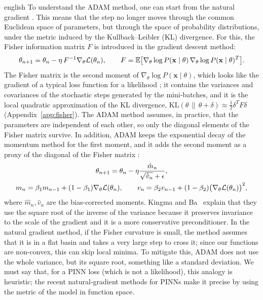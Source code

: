 \documentclass[../0000.tex]{subfiles}
\begin{document}
\begin{hyphenrules}{english}
To understand the ADAM method, one can start from the natural gradient
\cite{amari1998,pascanu2013}. This means that the step no longer moves through the common Euclidean
space of parameters, but through the space of probability distributions, under the metric induced by
the Kullback--Leibler (KL) divergence. For this, the Fisher information matrix $F$ is introduced in the
gradient descent method:
\begin{equation}
  \theta_{n+1}=\theta_n-\eta\,F^{-1}\nabla_\theta\mathcal{L}(\theta_n),\qquad
  F=\mathbb{E}\big[\nabla_\theta\log P(\mathbf{x}\mid\theta)\,\nabla_\theta\log P(\mathbf{x}\mid\theta)^{T}\big].
  \label{eq:natural-gradient}
\end{equation}
The Fisher matrix is the second moment of $\nabla_\theta\log P(\mathbf{x}\mid\theta)$, which looks like the
gradient of a typical loss function for a likelihood \cite{amari1998}; it contains the variances and
covariances of the stochastic steps generated by the mini-batches, and it is the local quadratic
approximation of the KL divergence, $\mathrm{KL}(\theta\,\|\,\theta+\delta)\approx\frac12\delta^{T}F\delta$
(Appendix~\ref{app:fisher}). The ADAM method assumes, in practice, that the parameters are independent of each
other, so only the diagonal elements of the Fisher matrix survive. In addition, ADAM keeps the exponential
decay of the momentum method \cite{ruder2016} for the first moment, and it adds the second moment as
a proxy of the diagonal of the Fisher matrix \cite{kingma2015}:
\begin{equation}
  \begin{gathered}
  \theta_{n+1}=\theta_n-\eta\frac{\hat m_n}{\sqrt{\hat v_n}+\epsilon},\\
  m_n=\beta_1m_{n-1}+(1-\beta_1)\nabla_\theta\mathcal{L}(\theta_n),\qquad
  v_n=\beta_2v_{n-1}+(1-\beta_2)\big(\nabla_\theta\mathcal{L}(\theta_n)\big)^2,
  \end{gathered}
  \label{eq:adam}
\end{equation}
where $\hat m_n,\hat v_n$ are the bias-corrected moments. Kingma and Ba~\cite{kingma2015} explain that they use the
square root of the inverse of the variance because it preserves invariance to the scale of the gradient
and it is a more conservative preconditioner. In the natural gradient method, if the Fisher curvature is
small, the method assumes that it is in a flat basin and takes a very large step to cross it; since our
functions are non-convex, this can skip local minima. To mitigate this, ADAM does not use the whole
variance, but its square root, something like a standard deviation. We must say that, for a PINN loss
(which is not a likelihood), this analogy is heuristic; the recent natural-gradient methods for PINNs
\cite{schwencke2025anagram,schwencke2025thesis} make it precise by using the metric of the model in
function space.


\end{hyphenrules}
\end{document}

